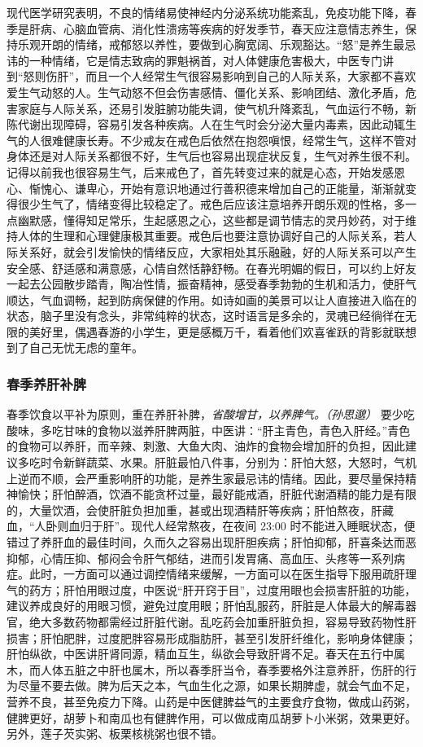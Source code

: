 现代医学研究表明，不良的情绪易使神经内分泌系统功能紊乱，免疫功能下降，春季是肝病、心脑血管病、消化性溃疡等疾病的好发季节，春天应注意情志养生，保持乐观开朗的情绪，戒郁怒以养性，要做到心胸宽阔、乐观豁达。“怒”是养生最忌讳的一种情绪，它是情志致病的罪魁祸首，对人体健康危害极大，中医专门讲到“怒则伤肝”，而且一个人经常生气很容易影响到自己的人际关系，大家都不喜欢爱生气动怒的人。生气动怒不但会伤害感情、僵化关系、影响团结、激化矛盾，危害家庭与人际关系，还易引发脏腑功能失调，使气机升降紊乱，气血运行不畅，新陈代谢出现障碍，容易引发各种疾病。人在生气时会分泌大量内毒素，因此动辄生气的人很难健康长寿。不少戒友在戒色后依然在抱怨嗔恨，经常生气，这样不管对身体还是对人际关系都很不好，生气后也容易出现症状反复，生气对养生很不利。记得以前我也很容易生气，后来戒色了，首先转变过来的就是心态，开始发感恩心、惭愧心、谦卑心，开始有意识地通过行善积德来增加自己的正能量，渐渐就变得很少生气了，情绪变得比较稳定了。戒色后应该注意培养开朗乐观的性格，多一点幽默感，懂得知足常乐，生起感恩之心，这些都是调节情志的灵丹妙药，对于维持人体的生理和心理健康极其重要。戒色后也要注意协调好自己的人际关系，若人际关系好，就会引发愉快的情绪反应，大家相处其乐融融，好的人际关系可以产生安全感、舒适感和满意感，心情自然恬静舒畅。在春光明媚的假日，可以约上好友一起去公园散步踏青，陶冶性情，振奋精神，感受春季勃勃的生机和活力，使肝气顺达，气血调畅，起到防病保健的作用。如诗如画的美景可以让人直接进入临在的状态，脑子里没有念头，非常纯粹的状态，这时语言是多余的，灵魂已经徜徉在无限的美好里，偶遇春游的小学生，更是感概万千，看着他们欢喜雀跃的背影就联想到了自己无忧无虑的童年。

\subsubsection{春季养肝补脾}

春季饮食以平补为原则，重在养肝补脾，\textit{省酸增甘，以养脾气。（孙思邈）} 要少吃酸味，多吃甘味的食物以滋养肝脾两脏，中医讲：“肝主青色，青色入肝经。”青色的食物可以养肝，而辛辣、刺激、大鱼大肉、油炸的食物会增加肝的负担，因此建议多吃时令新鲜蔬菜、水果。肝脏最怕八件事，分别为：肝怕大怒，大怒时，气机上逆而不顺，会严重影响肝的功能，是养生家最忌讳的情绪。因此，要尽量保持精神愉快；肝怕醉酒，饮酒不能贪杯过量，最好能戒酒，肝脏代谢酒精的能力是有限的，大量饮酒，会使肝脏负担加重，甚或出现酒精肝等疾病；肝怕熬夜，肝藏血，“人卧则血归于肝”。现代人经常熬夜，在夜间 23:00 时不能进入睡眠状态，便错过了养肝血的最佳时间，久而久之容易出现肝胆疾病；肝怕抑郁，肝喜条达而恶抑郁，心情压抑、郁闷会令肝气郁结，进而引发胃痛、高血压、头疼等一系列病症。此时，一方面可以通过调控情绪来缓解，一方面可以在医生指导下服用疏肝理气的药方；肝怕用眼过度，中医说“肝开窍于目”，过度用眼也会损害肝脏的功能，建议养成良好的用眼习惯，避免过度用眼；肝怕乱服药，肝脏是人体最大的解毒器官，绝大多数药物都需经过肝脏代谢。乱吃药会加重肝脏负担，容易导致药物性肝损害；肝怕肥胖，过度肥胖容易形成脂肪肝，甚至引发肝纤维化，影响身体健康；肝怕纵欲，中医讲肝肾同源，精血互生，纵欲会导致肝肾不足。春天在五行中属木，而人体五脏之中肝也属木，所以春季肝当令，春季要格外注意养肝，伤肝的行为尽量不要去做。脾为后天之本，气血生化之源，如果长期脾虚，就会气血不足，营养不良，甚至免疫力下降。山药是中医健脾益气的主要食疗食物，做成山药粥，健脾更好，胡萝卜和南瓜也有健脾作用，可以做成南瓜胡萝卜小米粥，效果更好。另外，莲子芡实粥、板栗核桃粥也很不错。

